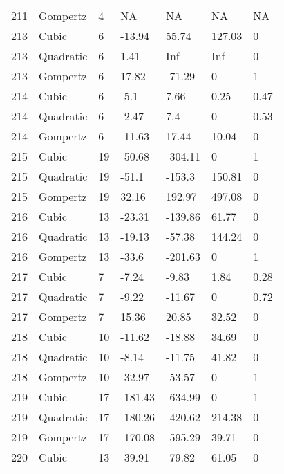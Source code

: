 \documentclass[11pt]{article}
\begin{document}
\begin{center}
\begin{longtable}{lllllll}
    211 & Gompertz  & 4               & NA      & NA      & NA      & NA   \\
    213 & Cubic     & 6               & -13.94  & 55.74   & 127.03  & 0    \\
    213 & Quadratic & 6               & 1.41    & Inf     & Inf     & 0    \\
    213 & Gompertz  & 6               & 17.82   & -71.29  & 0       & 1    \\
    214 & Cubic     & 6               & -5.1    & 7.66    & 0.25    & 0.47 \\
    214 & Quadratic & 6               & -2.47   & 7.4     & 0       & 0.53 \\
    214 & Gompertz  & 6               & -11.63  & 17.44   & 10.04   & 0    \\
    215 & Cubic     & 19              & -50.68  & -304.11 & 0       & 1    \\
    215 & Quadratic & 19              & -51.1   & -153.3  & 150.81  & 0    \\
    215 & Gompertz  & 19              & 32.16   & 192.97  & 497.08  & 0    \\
    216 & Cubic     & 13              & -23.31  & -139.86 & 61.77   & 0    \\
    216 & Quadratic & 13              & -19.13  & -57.38  & 144.24  & 0    \\
    216 & Gompertz  & 13              & -33.6   & -201.63 & 0       & 1    \\
    217 & Cubic     & 7               & -7.24   & -9.83   & 1.84    & 0.28 \\
    217 & Quadratic & 7               & -9.22   & -11.67  & 0       & 0.72 \\
    217 & Gompertz  & 7               & 15.36   & 20.85   & 32.52   & 0    \\
    218 & Cubic     & 10              & -11.62  & -18.88  & 34.69   & 0    \\
    218 & Quadratic & 10              & -8.14   & -11.75  & 41.82   & 0    \\
    218 & Gompertz  & 10              & -32.97  & -53.57  & 0       & 1    \\
    219 & Cubic     & 17              & -181.43 & -634.99 & 0       & 1    \\
    219 & Quadratic & 17              & -180.26 & -420.62 & 214.38  & 0    \\
    219 & Gompertz  & 17              & -170.08 & -595.29 & 39.71   & 0    \\
    220 & Cubic     & 13              & -39.91  & -79.82  & 61.05   & 0    \\

\end{longtable}
\end{center}
\end{document}
